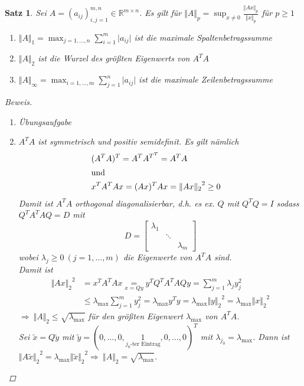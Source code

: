\documentclass[12pt]{article}
\theoremstyle{break}
\newtheorem{theorem}{Satz}[subsection]
\begin{document}
\begin{theorem}
Sei $A = (a_{ij})_{i,j=1}^{m,n} \in \mathbb{R}^{m \times n}$. Es gilt für $\Vert A \Vert_p = \sup_{x \neq 0} \frac{\Vert Ax \Vert_p}{\Vert x \Vert_p}$ für $p \geq 1$
\begin{enumerate}
  \item[i)] $\Vert A \Vert_1 = \max_{j=1,...,n} \sum_{i=1}^m \vert a_{ij} \vert$ ist die maximale Spaltenbetragssumme
  \item[ii)] $\Vert A \Vert_2$ ist die Wurzel des größten Eigenwerts von $A^TA$
  \item[iii)] $\Vert A \Vert_{\infty} = \max_{i=1,...,m} \sum_{j=1}^n \vert a_{ij} \vert$ ist die maximale Zeilenbetragssumme
\end{enumerate}
\begin{proof}[Beweis]\leavevmode
\begin{enumerate}
  \item[i) + iii)] Übungsaufgabe
  \item[ii)] $A^TA$ ist symmetrisch und positiv semidefinit. Es gilt nämlich 
  \begin{align*}
  &(A^TA)^T = A^T A^{T^T} = A^TA &\\
  \intertext{und}
  &x^TA^TAx = (Ax)^T Ax = {\Vert Ax \Vert_2}^2 \geq 0 &\\
  \end{align*} 
  Damit ist $A^TA$ orthogonal diagonalisierbar, d.h. es ex. $Q$ mit $Q^TQ = I$ sodass $Q^TA^TAQ = D$ mit 
  $$D = 
  \begin{bmatrix}
  \lambda_1 \\
  & \ddots \\
  && \lambda_m
  \end{bmatrix}$$
  wobei $\lambda_j \geq 0 \medspace(j=1,...,m)$ die Eigenwerte von $A^TA$ sind.\\
  Damit ist
  \begin{align*}
  {\Vert Ax \Vert_2}^2 &= x^TA^TAx \underset{x = Qy}{=} y^TQ^TA^TAQy = \sum_{j=1}^m \lambda_j y_j^2 \\
  & \leq \lambda_{\max} \sum_{j=1}^m y_j^2 = \lambda_{\max} y^Ty = \lambda_{\max} {\Vert y \Vert_2}^2 = \lambda_{\max} {\Vert x \Vert_2}^2
  \end{align*}
  $\Rightarrow \medspace \Vert A \Vert_2 \leq \sqrt{\lambda_{\max}}$ für den größten Eigenwert $\lambda_{\max}$ von $A^TA$.\\
  Sei $\tilde{x} = Q\tilde{y}$ mit $\tilde{y} = (0,...,0,\underset{\text{$j_0$-ter Eintrag}}{1},0,...,0)^T$ mit $\lambda_{j_0} = \lambda_{\max}$. Dann ist ${\Vert A\tilde{x} \Vert_2}^2 = \lambda_{\max} {\Vert \tilde{x} \Vert_2}^2 \Rightarrow \medspace \Vert A \Vert_2 = \sqrt{\lambda_{\max}}$.
\end{enumerate}
\end{proof}
\end{theorem}
\end{document}
